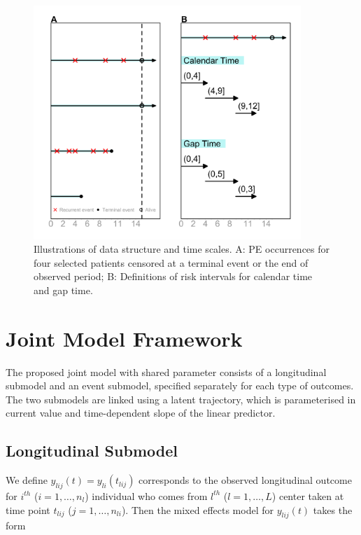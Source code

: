 \begin{figure}[ht]
\centering
\includegraphics[width=0.9\textwidth]{Figures/Chp3_censor.png}
\caption{Illustrations of data structure and time scales. A: PE occurrences for four selected patients censored at a terminal event or the end of observed period; B: Definitions of risk intervals for calendar time and gap time.}
\label{fig:chp3_censor}
\end{figure}

\section{Joint Model Framework} \label{sec:chp3_mod}

The proposed joint model with shared parameter consists of a longitudinal submodel and an event submodel, specified separately for each type of outcomes. The two submodels are linked using a latent trajectory, which is parameterised in current value and time-dependent slope of the linear predictor. 

\subsection{Longitudinal Submodel}

We define $y_{lij}(t)=y_{li}(t_{lij})$ corresponds to the observed longitudinal outcome for $i^{th}$ ($i=1,\dots,n_l$) individual who comes from $l^{th}$ ($l=1,\dots, L$) center taken at time point $t_{lij}$ ($j=1,\dots,n_{li}$). Then the mixed effects model for $y_{lij}(t)$ takes the form

